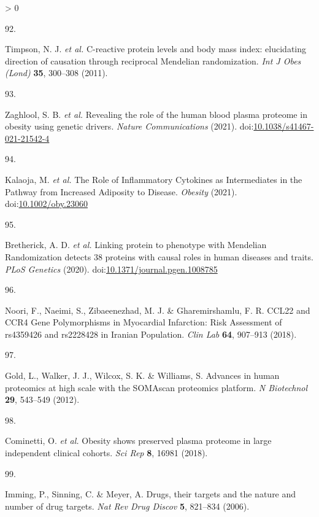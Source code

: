 \documentclass[11pt,twoside]{bristolthesis}
\newlength{\cslhangindent}
\newlength{\csllabelwidth}
\newenvironment{CSLReferences}[2] %
 {%
  \setlength{\parindent}{0pt}
  \ifodd #1 \everypar{\setlength{\hangindent}{\cslhangindent}}\ignorespaces\fi
  \ifnum #2 > 0
  \setlength{\parskip}{#2\baselineskip}
  \fi
 }%
 {}
\newcommand{\CSLLeftMargin}[1]{\parbox[t]{\csllabelwidth}{#1}}
\newcommand{\CSLRightInline}[1]{\parbox[t]{\linewidth - \csllabelwidth}{#1}\break}
\begin{document}
\begin{CSLReferences}{0}{0}
\leavevmode\hypertarget{ref-Timpson2011}{}%
\CSLLeftMargin{92. }
\CSLRightInline{Timpson, N. J. \emph{et al.} {C-reactive protein levels and body mass index: elucidating direction of causation through reciprocal Mendelian randomization}. \emph{Int J Obes (Lond)} \textbf{35}, 300--308 (2011).}

\leavevmode\hypertarget{ref-Zaghlool2021}{}%
\CSLLeftMargin{93. }
\CSLRightInline{Zaghlool, S. B. \emph{et al.} {Revealing the role of the human blood plasma proteome in obesity using genetic drivers}. \emph{Nature Communications} (2021). doi:\href{https://doi.org/10.1038/s41467-021-21542-4}{10.1038/s41467-021-21542-4}}

\leavevmode\hypertarget{ref-Kalaoja2021}{}%
\CSLLeftMargin{94. }
\CSLRightInline{Kalaoja, M. \emph{et al.} {The Role of Inflammatory Cytokines as Intermediates in the Pathway from Increased Adiposity to Disease}. \emph{Obesity} (2021). doi:\href{https://doi.org/10.1002/oby.23060}{10.1002/oby.23060}}

\leavevmode\hypertarget{ref-Bretherick2020}{}%
\CSLLeftMargin{95. }
\CSLRightInline{Bretherick, A. D. \emph{et al.} {Linking protein to phenotype with Mendelian Randomization detects 38 proteins with causal roles in human diseases and traits}. \emph{PLoS Genetics} (2020). doi:\href{https://doi.org/10.1371/journal.pgen.1008785}{10.1371/journal.pgen.1008785}}

\leavevmode\hypertarget{ref-Noori2018}{}%
\CSLLeftMargin{96. }
\CSLRightInline{Noori, F., Naeimi, S., Zibaeenezhad, M. J. \& Gharemirshamlu, F. R. {CCL22 and CCR4 Gene Polymorphisms in Myocardial Infarction: Risk Assessment of rs4359426 and rs2228428 in Iranian Population}. \emph{Clin Lab} \textbf{64}, 907--913 (2018).}

\leavevmode\hypertarget{ref-Gold2012}{}%
\CSLLeftMargin{97. }
\CSLRightInline{Gold, L., Walker, J. J., Wilcox, S. K. \& Williams, S. {Advances in human proteomics at high scale with the SOMAscan proteomics platform}. \emph{N Biotechnol} \textbf{29}, 543--549 (2012).}

\leavevmode\hypertarget{ref-Cominetti2018}{}%
\CSLLeftMargin{98. }
\CSLRightInline{Cominetti, O. \emph{et al.} {Obesity shows preserved plasma proteome in large independent clinical cohorts}. \emph{Sci Rep} \textbf{8}, 16981 (2018).}

\leavevmode\hypertarget{ref-Imming2006}{}%
\CSLLeftMargin{99. }
\CSLRightInline{Imming, P., Sinning, C. \& Meyer, A. {Drugs, their targets and the nature and number of drug targets}. \emph{Nat Rev Drug Discov} \textbf{5}, 821--834 (2006).}


\end{CSLReferences}
\end{document}
